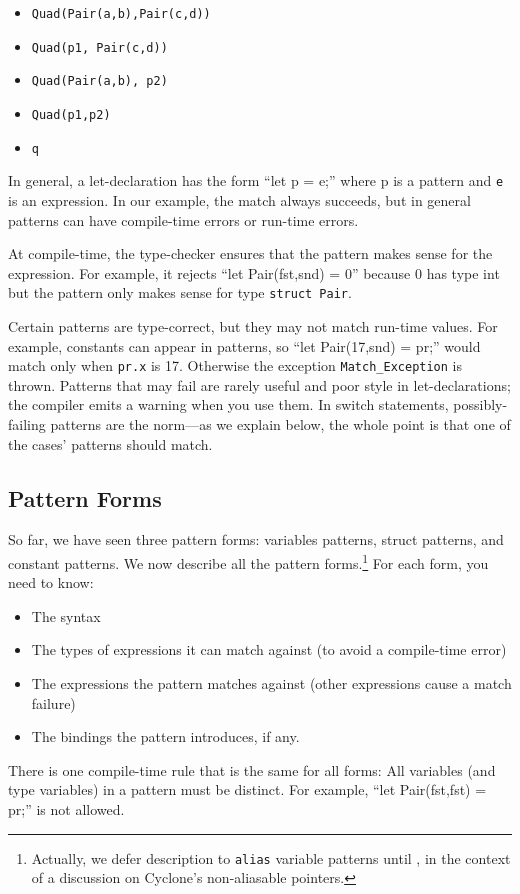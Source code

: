 \begin{itemize}
\item \texttt{Quad(Pair(a,b),Pair(c,d))}
\item \texttt{Quad(p1, Pair(c,d))}
\item \texttt{Quad(Pair(a,b), p2)}
\item \texttt{Quad(p1,p2)}
\item \texttt{q}
\end{itemize}

In general, a let-declaration has the form ``let p = e;'' where p is a
pattern and \texttt{e} is an expression.  In our example, the match
always succeeds, but in general patterns can have compile-time errors
or run-time errors.

At compile-time, the type-checker ensures that the pattern makes sense
for the expression.  For example, it rejects ``let Pair(fst,snd) = 0''
because 0 has type int but the pattern only makes sense for type
\texttt{struct Pair}.

Certain patterns are type-correct, but they may not match run-time
values.  For example, constants can appear in patterns, so ``let
Pair(17,snd) = pr;'' would match only when \texttt{pr.x} is 17.
Otherwise the exception \texttt{Match_Exception} is thrown.  Patterns
that may fail are rarely useful and poor style in let-declarations;
the compiler emits a warning when you use them.  In switch statements,
possibly-failing patterns are the norm---as we explain below, the
whole point is that one of the cases' patterns should match.

\subsection{Pattern Forms}\hypertarget{pat_forms}{}

So far, we have seen three pattern forms: variables patterns, struct
patterns, and constant patterns.  We now describe all the pattern
forms.\footnote{Actually, we defer description to \texttt{alias} variable
patterns until , in
the context of a discussion on Cyclone's non-aliasable pointers.}  For each
form, you need to know:

\begin{itemize}
\item The syntax
\item The types of expressions it can match against (to avoid a
  compile-time error)
\item The expressions the pattern matches against (other expressions
  cause a match failure)
\item The bindings the pattern introduces, if any.
\end{itemize}
There is one compile-time rule that is the same for all forms: All
variables (and type variables) in a pattern must be distinct.  For
example, ``let Pair(fst,fst) = pr;'' is not allowed.

